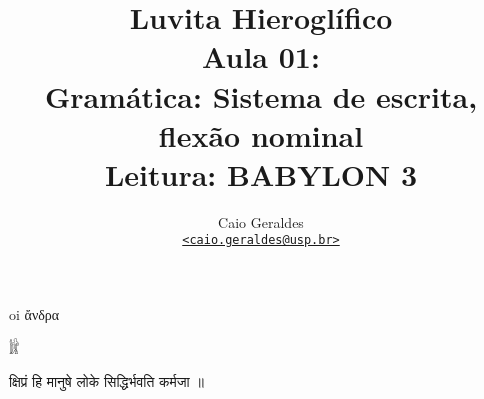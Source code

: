 \documentclass[a4paper,12pt,article]{memoir}
\title{Luvita Hieroglífico\\\hspace{10pt}\large Aula 01:\\\large Gramática: Sistema de escrita, flexão nominal\\\large Leitura: BABYLON 3}
\author{Caio Geraldes\\\href{mailto:caio.geraldes@usp.br}{\texttt{<caio.geraldes@usp.br>}} }
\begin{document}
\maketitle

oi ἄνδρα

𔐂


क्षिप्रं हि मानुषे लोके सिद्धिर्भवति कर्मजा ॥

\medskip
\end{document}
